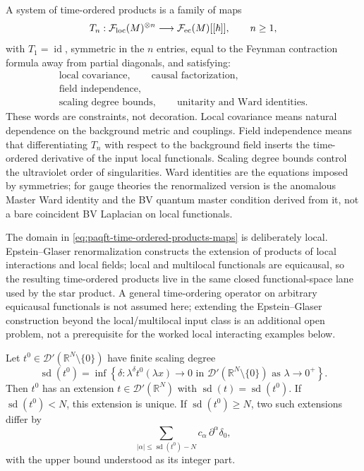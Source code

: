 A system of time-ordered products is a family of maps
\begin{equation}
  T_n:\mathcal F_{\rm loc}(M)^{\otimes n}
  \longrightarrow
  \mathcal F_{\rm ec}(M)[[\hbar]],
  \qquad n\ge1,
  \label{eq:paqft-time-ordered-products-maps}
\end{equation}
with \(T_1=\operatorname{id}\), symmetric in the \(n\) entries, equal to the
Feynman contraction formula away from partial diagonals, and satisfying:
\[
\begin{gathered}
  \text{local covariance},\qquad
  \text{causal factorization},\\
  \text{field independence},\\
  \text{scaling degree bounds},\qquad
  \text{unitarity and Ward identities}.
\end{gathered}
\]
These words are constraints, not decoration.  Local covariance means natural
dependence on the background metric and couplings.  Field independence means
that differentiating \(T_n\) with respect to the background field inserts the
time-ordered derivative of the input local functionals.  Scaling degree
bounds control the ultraviolet order of singularities.  Ward identities are
the equations imposed by symmetries; for gauge theories the renormalized
version is the anomalous Master Ward identity and the BV quantum master
condition derived from it, not a bare coincident BV Laplacian on local
functionals.

The domain in \eqref{eq:paqft-time-ordered-products-maps} is deliberately
local.  Epstein--Glaser renormalization constructs the extension of products
of local interactions and local fields; local and multilocal functionals are
equicausal, so the resulting time-ordered products live in the same closed
functional-space lane used by the star product.  A general time-ordering
operator on arbitrary equicausal functionals is not assumed here; extending
the Epstein--Glaser construction beyond the local/multilocal input class is
an additional open problem, not a prerequisite for the worked local
interacting examples below.

\begin{theorem}
\label{thm:paqft-extension-scaling-degree}
Let \(t^0\in\mathcal D'(\mathbb R^N\setminus\{0\})\) have finite scaling
degree
\[
  \operatorname{sd}(t^0)
  =
  \inf\left\{\delta:
    \lambda^\delta t^0(\lambda x)\to0
    \text{ in }\mathcal D'(\mathbb R^N\setminus\{0\})
    \text{ as }\lambda\to0^+
  \right\}.
\]
Then \(t^0\) has an extension \(t\in\mathcal D'(\mathbb R^N)\) with
\(\operatorname{sd}(t)=\operatorname{sd}(t^0)\).  If
\(\operatorname{sd}(t^0)<N\), this extension is unique.  If
\(\operatorname{sd}(t^0)\ge N\), two such extensions differ by
\begin{equation}
  \sum_{|\alpha|\le \operatorname{sd}(t^0)-N}
  c_\alpha\,\partial^\alpha\delta_0 ,
  \label{eq:paqft-extension-ambiguity}
\end{equation}
with the upper bound understood as its integer part.
\end{theorem}

